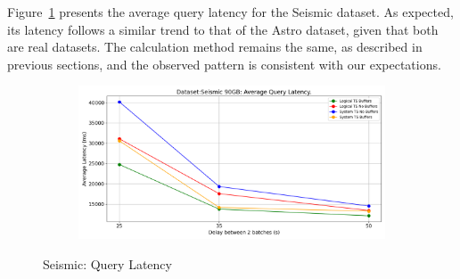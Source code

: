 %
Figure~\ref{fig:query-latency-seismic} presents the average query latency for the Seismic
dataset. As expected, its latency follows a similar trend to that of the Astro dataset,
given that both are real datasets. The calculation method remains the same, as described in
previous sections, and the observed pattern is consistent with our expectations.

\begin{figure}
	\centering
	\begin{subfigure}[c]{0.45\textwidth}
		\includegraphics[width=1\textwidth]   {figures/Experiments/Dynamic/SEISMIC/average_latency_SEISMIC.png}
	\end{subfigure}
	\caption{Seismic: Query Latency}
	\label{fig:query-latency-seismic}
\end{figure}